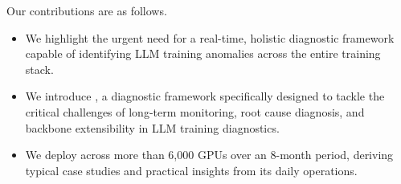 
Our contributions are as follows.
\begin{itemize}
[leftmargin=*,topsep=0.2em,itemsep=-0.2em]
    \item We highlight the urgent need for a real-time, holistic diagnostic framework capable of identifying LLM training anomalies across the entire training stack.
    
    \item We introduce \sysname{}, a diagnostic framework specifically designed to tackle the critical challenges of long-term monitoring, root cause diagnosis, and backbone extensibility in LLM training diagnostics.

    \item We deploy \sysname{} across more than 6,000 GPUs over an 8-month period, deriving typical case studies and practical insights from its daily operations.
    
\end{itemize}





